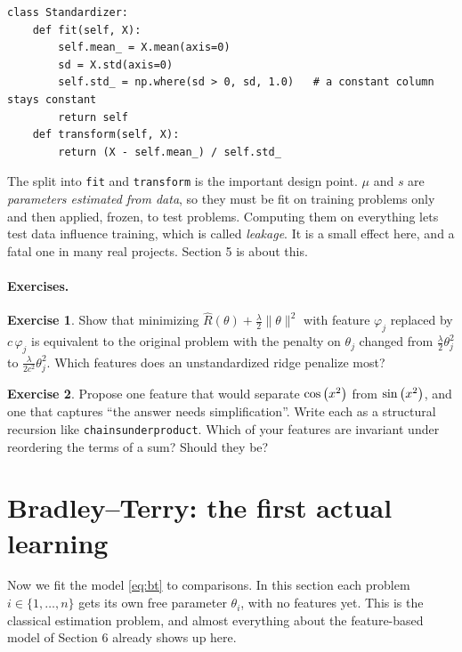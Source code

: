 \documentclass[11pt]{article}
\theoremstyle{definition}
\newtheorem{exercise}{Exercise}[section]
\theoremstyle{plain}
\theoremstyle{remark}
\newcommand{\code}[1]{\texttt{#1}}
\renewcommand{\_}{\oldunderscore\allowbreak}
\newcommand{\file}[1]{\textcolor{blue!50!black}{\texttt{#1}}}
\newcommand{\codefrom}[1]{\par\smallskip\noindent{\footnotesize\textbf{From} \file{#1}}}
\begin{document}
\codefrom{src/calcdiff/features.py}
\begin{lstlisting}
class Standardizer:
    def fit(self, X):
        self.mean_ = X.mean(axis=0)
        sd = X.std(axis=0)
        self.std_ = np.where(sd > 0, sd, 1.0)   # a constant column stays constant
        return self
    def transform(self, X):
        return (X - self.mean_) / self.std_
\end{lstlisting}
The split into \code{fit} and \code{transform} is the important design point. $\mu$ and $s$ are \emph{parameters
estimated from data}, so they must be fit on training problems only and then applied, frozen, to test problems.
Computing them on everything lets test data influence training, which is called \emph{leakage}. It is a small effect here,
and a fatal one in many real projects. Section 5 is about this.

\paragraph{Exercises.}
\begin{exercise}\label{ex:scale}
Show that minimizing $\widehat R(\theta)+\frac\lambda2\|\theta\|^2$ with feature $\varphi_j$ replaced by $c\,\varphi_j$ is equivalent to
the original problem with the penalty on $\theta_j$ changed from $\frac\lambda2\theta_j^2$ to $\frac{\lambda}{2c^2}\theta_j^2$. Which features does
an unstandardized ridge penalize most?
\end{exercise}
\begin{exercise}
Propose one feature that would separate $\cos\left(x^{2}\right)$ from $\sin\left(x^{2}\right)$, and one that captures ``the answer needs
simplification''. Write each as a structural recursion like \code{\_chains\_under\_product}. Which of your
features are invariant under reordering the terms of a sum? Should they be?
\end{exercise}

\section{Bradley--Terry: the first actual learning}
\label{sec:bt}

Now we fit the model \eqref{eq:bt} to comparisons. In this section each problem $i\in\{1,\dots,n\}$
gets its own free parameter $\theta_i$, with no features yet. This is the classical estimation problem,
and almost everything about the feature-based model of Section 6 already shows up here.
\end{document}
